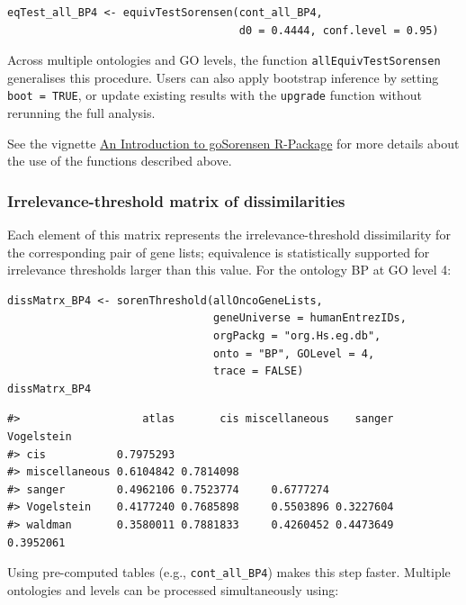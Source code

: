 \begin{verbatim}
eqTest_all_BP4 <- equivTestSorensen(cont_all_BP4,
                                    d0 = 0.4444, conf.level = 0.95)
\end{verbatim}

Across multiple ontologies and GO levels, the function \texttt{allEquivTestSorensen} generalises this procedure. Users can also apply bootstrap inference by setting \texttt{boot\ =\ TRUE}, or update existing results with the \texttt{upgrade} function without rerunning the full analysis.

See the vignette \href{https://www.bioconductor.org/packages/release/bioc/vignettes/goSorensen/inst/doc/goSorensen_Introduction.html}{An Introduction to goSorensen R-Package} for more details about the use of the functions described above.

\subsubsection{Irrelevance-threshold matrix of dissimilarities}\label{irrelevance-threshold-matrix-of-dissimilarities}

Each element of this matrix represents the irrelevance-threshold dissimilarity for the corresponding pair of gene lists; equivalence is statistically supported for irrelevance thresholds larger than this value. For the ontology BP at GO level 4:

\begin{verbatim}
dissMatrx_BP4 <- sorenThreshold(allOncoGeneLists,
                                geneUniverse = humanEntrezIDs, 
                                orgPackg = "org.Hs.eg.db",
                                onto = "BP", GOLevel = 4,
                                trace = FALSE)
dissMatrx_BP4
\end{verbatim}

\begin{verbatim}
#>                   atlas       cis miscellaneous    sanger Vogelstein
#> cis           0.7975293                                             
#> miscellaneous 0.6104842 0.7814098                                   
#> sanger        0.4962106 0.7523774     0.6777274                     
#> Vogelstein    0.4177240 0.7685898     0.5503896 0.3227604           
#> waldman       0.3580011 0.7881833     0.4260452 0.4473649  0.3952061
\end{verbatim}

Using pre-computed tables (e.g., \texttt{cont\_all\_BP4}) makes this step faster. Multiple ontologies and levels can be processed simultaneously using:


